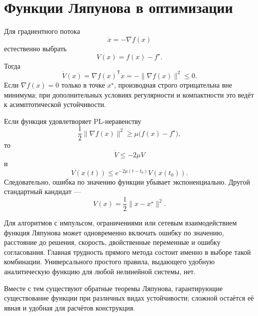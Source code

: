 \section{Функции Ляпунова в оптимизации}

Для градиентного потока
\[
    \dot x=-\nabla f(x)
\]
естественно выбрать
\[
    V(x)=f(x)-f^\star.
\]
Тогда
\[
    \dot V(x)
    =
    \nabla f(x)^{\mathsf T}\dot x
    =
    -\lVert\nabla f(x)\rVert^2
    \le0.
\]
Если \(\nabla f(x)=0\) только в точке \(x^\star\), производная строго
отрицательна вне минимума; при дополнительных условиях регулярности и
компактности это ведёт к асимптотической устойчивости.

Если функция удовлетворяет PL-неравенству
\[
    \frac12\lVert\nabla f(x)\rVert^2
    \ge
    \mu\bigl(f(x)-f^\star\bigr),
\]
то
\[
    \dot V
    \le
    -2\mu V
\]
и
\[
    V(x(t))
    \le
    e^{-2\mu(t-t_0)}V(x(t_0)).
\]
Следовательно, ошибка по значению функции убывает экспоненциально.
Другой стандартный кандидат ---
\[
    V(x)=\frac12\lVert x-x^\star\rVert^2.
\]

Для алгоритмов с импульсом, ограничениями или сетевым взаимодействием
функция Ляпунова может одновременно включать ошибку по значению,
расстояние до решения, скорость, двойственные переменные и ошибку
согласования. Главная трудность прямого метода состоит именно в
выборе такой комбинации. Универсального простого правила, выдающего
удобную аналитическую функцию для любой нелинейной системы, нет.

Вместе с тем существуют обратные теоремы Ляпунова, гарантирующие
существование функции при различных видах устойчивости; сложной
остаётся её явная и удобная для расчётов конструкция.
